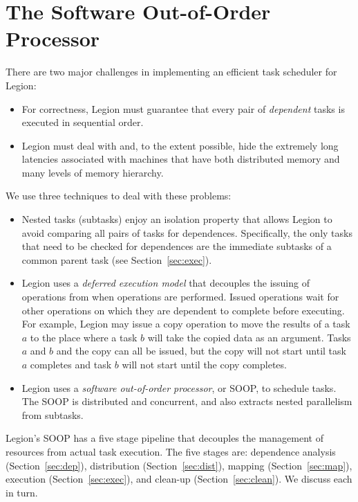 \section{The Software Out-of-Order Processor}
\label{sec:soop}

There are two major challenges in implementing an efficient task
scheduler for Legion:
\begin{itemize}
\item  For correctness, Legion must guarantee that every pair of {\em dependent} tasks is executed 
in sequential order.

\item Legion must deal with and, to
  the extent possible, hide the extremely long latencies associated
  with machines that have both distributed memory and many levels of
  memory hierarchy.
\end{itemize}
We use three techniques to deal with these problems:
\begin{itemize}
\item Nested tasks (subtasks) enjoy an isolation property that allows Legion
to avoid comparing all pairs of tasks for dependences.
Specifically, the only tasks that need to be checked for dependences 
are the immediate subtasks of a common
parent task (see Section~\ref{sec:exec}).

\item Legion uses a {\em deferred execution model} that decouples the issuing
of operations from when operations are performed.  Issued operations wait for other operations on
which they are dependent to complete before executing.  For example, Legion may issue a copy
operation to move the results of a task $a$ to the place where a task $b$ will take the copied data as
an argument.  Tasks $a$ and $b$ and the copy can all be issued, but the copy will not start until
task $a$ completes and task $b$ will not start until the copy completes.

\item Legion uses a {\em  software out-of-order processor}, or SOOP, to schedule tasks.  The SOOP 
is distributed and concurrent, and also extracts nested parallelism from subtasks.
\end{itemize}
Legion's SOOP has a five stage pipeline that  decouples the management of resources from actual
task execution.  The five stages are: dependence analysis (Section~\ref{sec:dep}),
distribution (Section~\ref{sec:dist}),
mapping (Section~\ref{sec:map}),
execution (Section~\ref{sec:exec}),
and clean-up (Section~\ref{sec:clean}).
We discuss each in turn.

